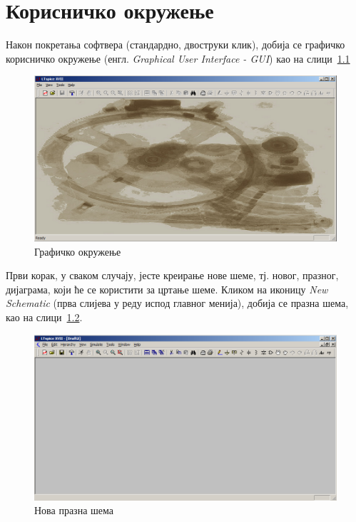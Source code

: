 \chapter{Корисничко окружење}
\label{user}

Након покретања софтвера (стандардно, двоструки клик), добија се графичко корисничко окружење (енгл. \textit{Graphical User Interface - GUI}) као на слици~\ref{Fig:empty}

\begin{figure}[h]
\centering
\includegraphics[width=\figwidth\textwidth]{figs/empty.png}
\caption{Графичко окружење}
\label{Fig:empty}
\end{figure}

Први корак, у сваком случају, јесте креирање нове шеме, тј. новог, празног, дијаграма, који ће се користити за цртање шеме. Кликом на иконицу \textit{New Schematic} (прва слијева у реду испод главног менија), добија се празна шема, као на слици~\ref{Fig:new}.

\begin{figure}[h]
\centering
\includegraphics[width=\figwidth\textwidth]{figs/new.png}
\caption{Нова празна шема}
\label{Fig:new}
\end{figure}

